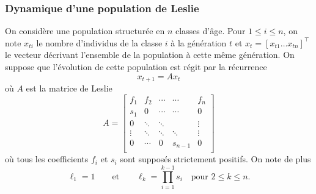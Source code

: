 \subsubsection{Dynamique d'une population de Leslie \todo{}}

On considère une population structurée en $n$ classes d'âge. Pour $1 \leq i \leq n$, on note $x_{ti}$ le nombre d'individus de la classe $i$ à la génération $t$ et $x_t = [x_{t1} \dots x_{tn}]^\top$ le vecteur décrivant l'ensemble de la population à cette même génération. On suppose que l'évolution de cette population est régit par la récurrence
$$
x_{t+1} = A x_t
$$
où $A$ est la matrice de Leslie
$$
A = \left[\begin{array}{cccccc}
            f_1 & f_2 & \cdots  & \cdots & f_n \\
            s_1 & 0 & \cdots  & \cdots & 0 \\
            0 & \ddots  & \ddots & & \vdots \\
            \vdots & \ddots & \ddots & \ddots & \vdots \\
            0 & \cdots & 0 & s_{n-1} & 0 \\
          \end{array}\right]
$$
où tous les coefficients $f_i$ et $s_i$ sont supposés strictement positifs. On note de plus
$$
\ell_1 = 1 \qquad \text{et} \qquad 
\ell_k = \prod_{i=1}^{k-1} s_i \quad \text{pour $2 \leq k \leq n$}.
$$

